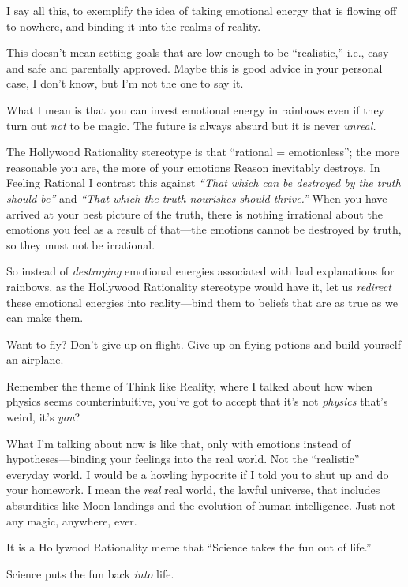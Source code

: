 {
 I say all this, to exemplify the idea of taking emotional energy
that is flowing off to nowhere, and binding it into the realms of
reality.}

{
 This doesn't mean setting goals that are low
enough to be ``realistic,'' i.e.,
easy and safe and parentally approved. Maybe this is good advice in
your personal case, I don't know, but
I'm not the one to say it.}

{
 What I mean is that you can invest emotional energy in rainbows
even if they turn out \textit{not} to be magic. The future is always
absurd but it is never \textit{unreal.}}

{
 The Hollywood Rationality stereotype is that
``rational = emotionless''; the more
reasonable you are, the more of your emotions Reason inevitably
destroys. In Feeling Rational I contrast this against
\textit{``That which can be destroyed by the truth
should be''} and \textit{``That
which the truth nourishes should thrive.''} When you
have arrived at your best picture of the truth, there is nothing
irrational about the emotions you feel as a result of that---the
emotions cannot be destroyed by truth, so they must not be irrational.}

{
 So instead of \textit{destroying} emotional energies associated
with bad explanations for rainbows, as the Hollywood Rationality
stereotype would have it, let us \textit{redirect} these emotional
energies into reality---bind them to beliefs that are as true as we can
make them.}

{
 Want to fly? Don't give up on flight. Give up on
flying potions and build yourself an airplane.}

{
 Remember the theme of Think like Reality, where I talked about how
when physics seems counterintuitive, you've got to
accept that it's not \textit{physics}
that's weird, it's \textit{you}?}

{
 What I'm talking about now is like that, only with
emotions instead of hypotheses---binding your feelings into the real
world. Not the ``realistic''
everyday world. I would be a howling hypocrite if I told you to shut up
and do your homework. I mean the \textit{real} real world, the lawful
universe, that includes absurdities like Moon landings and the
evolution of human intelligence. Just not any magic, anywhere, ever.}

{
 It is a Hollywood Rationality meme that ``Science
takes the fun out of life.''}

{
 Science puts the fun back \textit{into} life.}

